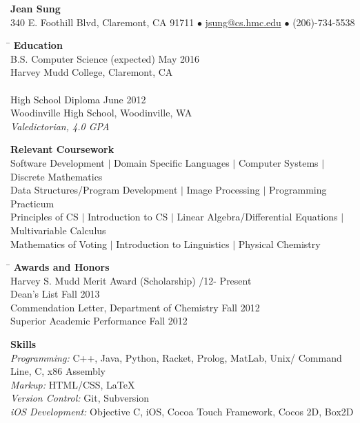 \documentclass[11.5pt]{article}
\makeatletter
\newcommand{\name}{\large\textbf{Jean Sung}}
\newcommand{\addr}{340 E. Foothill Blvd, Claremont, CA 91711 }
\newcommand{\email}{\url{jsung@cs.hmc.edu}}
\newcommand{\phone}{(206)-734-5538 }
\newcommand{\headerdot}{  $\bullet$  }
\newcommand{\vb}{ $\mid$ }
\newcommand{\sectionNL}{\\[2pt]}
\makeatother
\begin{document}
\begin{center}
\name \\
\addr \headerdot \email \headerdot \phone
\end{center}


\begin{tabbing}
\hspace*{6.5in}\= \kill
{\large \textbf{Education} } \> \sectionNL
B.S. Computer Science (expected) \> May 2016 \\
Harvey Mudd College, Claremont, CA \> \\ \\

High School Diploma \> June 2012 \\
Woodinville High School, Woodinville, WA \> \\
\textit{Valedictorian, 4.0 GPA}
\end{tabbing}


\begin{flushleft}
{\large \textbf{Relevant Coursework}} \sectionNL
Software Development \vb Domain Specific Languages \vb Computer Systems \vb Discrete Mathematics \\
Data Structures/Program Development \vb Image Processing \vb Programming Practicum  \\
Principles of CS \vb Introduction to CS \vb Linear Algebra/Differential Equations \vb Multivariable Calculus \\
Mathematics of Voting \vb Introduction to Linguistics \vb Physical Chemistry 
\end{flushleft}

\begin{tabbing}
\hspace*{6.5in}\= \kill
{\large \textbf{Awards and Honors} } \> \sectionNL
Harvey S. Mudd Merit Award (Scholarship) /12- Present \\
Dean's List \> Fall 2013 \\
Commendation Letter, Department of Chemistry \> Fall 2012 \\
Superior Academic Performance \> Fall 2012
\end{tabbing}

\begin{flushleft}
{\large \textbf{Skills}} \sectionNL
\textit{Programming:} C++, Java, Python, Racket, Prolog, MatLab, Unix/ Command Line, C, x86 Assembly\\
\textit{Markup:} HTML/CSS, LaTeX \\
\textit{Version Control:} Git, Subversion\\
\textit{iOS Development:} Objective C, iOS, Cocoa Touch Framework, Cocos 2D, Box2D
\end{flushleft}
\end{document}

